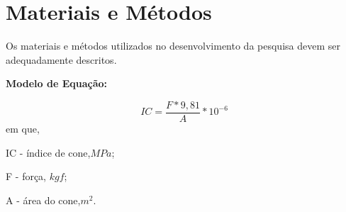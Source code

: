 \section*{Materiais e Métodos}

Os materiais e métodos utilizados no desenvolvimento da pesquisa devem ser adequadamente descritos.

\textbf{Modelo de Equação:}

\begin{equation} \label{eq:nome}
IC=\frac{F*9,81}{A}*10^{-6}
\end{equation}
em que,

IC - índice de cone,$MPa$;

F - força, $kgf$;

A - área do cone,$m^{2}$.

